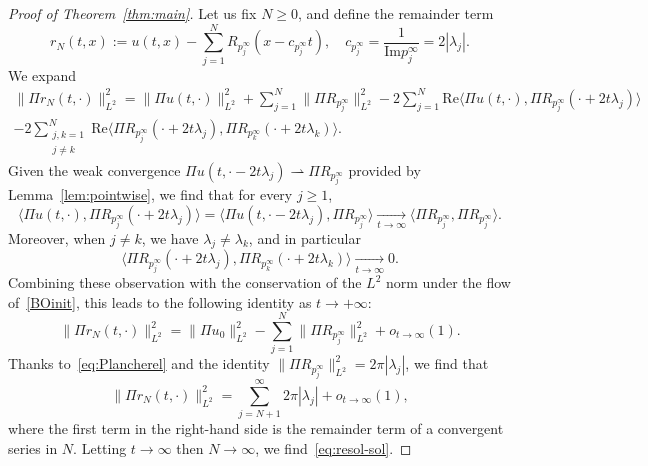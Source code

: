 \documentclass[english, 12pt]{amsart}%
\renewcommand{\Im}{\mathrm{Im}}
\renewcommand{\Re}{\mathrm{Re}}
\newcommand{\longrightarroww}[2] {\mathop{\longrightarrow}\limits_{#1}^{#2}}
\numberwithin{equation}{section}
\begin{document}
\begin{proof}[Proof of Theorem~\ref{thm:main}]
Let us fix $N\geq 0$, and define the remainder term
\[
 r_N(t,x):=u(t,x)-\sum_{j=1}^NR_{p_j^\infty}(x-c_{p_j^\infty}t),
 \quad
c_{p_j^\infty}=\frac{1}{\Im p_j^\infty}=2|\lambda_j|.
\]
We expand
\begin{multline*}
\|\Pi r_N(t,\cdot)\|_{L^2}^2
	=\|\Pi u(t,\cdot)\|_{L^2}^2+\sum_{j=1}^N \|\Pi R_{p_j^\infty}\|_{L^2}^2
	-2\sum_{j=1}^N\Re\langle \Pi u(t,\cdot),\Pi R_{p_j^\infty}(\cdot+2t\lambda_j)\rangle
	\\
	-2\sum_{\substack{j,k=1\\ j\neq k}}^N\Re\langle \Pi R_{p_j^\infty}(\cdot+2t\lambda_j),\Pi R_{p_k^\infty}(\cdot+2t\lambda_k)\rangle.
\end{multline*}
Given the weak convergence $\Pi u(t,\cdot-2t\lambda_j)\rightharpoonup \Pi R_{p_j^\infty}$ provided by Lemma~\ref{lem:pointwise}, we find that for every $j\geq 1$,
\[
\langle \Pi u(t,\cdot),\Pi R_{p_j^\infty}(\cdot+2t\lambda_j)\rangle
	=\langle \Pi u(t,\cdot-2t\lambda_j),\Pi R_{p_j^\infty}\rangle
	\longrightarroww{t\to\infty}{} \langle \Pi R_{p_j^\infty},\Pi R_{p_j^\infty}\rangle.
\]
Moreover, when $j\neq k$, we have $\lambda_j\neq \lambda_k$, and in particular
\[
\langle \Pi R_{p_j^\infty}(\cdot+2t\lambda_j),\Pi R_{p_k^\infty}(\cdot+2t\lambda_k)\rangle
	\longrightarroww{t\to\infty}{} 0.
\]
Combining these observation with the conservation of the $L^2$ norm under the flow of~\eqref{BOinit},  this leads to the following identity as $t\to+\infty$:
\begin{equation*}
\|\Pi r_N(t,\cdot)\|_{L^2}^2
	=\|\Pi u_0\|_{L^2}^2
	-\sum_{j=1}^N \|\Pi R_{p_j^\infty}\|_{L^2}^2
	+o_{t\to\infty}(1).
\end{equation*}
Thanks to~\eqref{eq:Plancherel} and the identity $\|\Pi R_{p_j^\infty}\|_{L^2}^2=2\pi|\lambda_j|$, we find that
\begin{equation*}
\|\Pi r_N(t,\cdot)\|_{L^2}^2
	=\sum_{j=N+1}^{\infty} 2\pi|\lambda_j|
	+o_{t\to\infty}(1),
\end{equation*}
where the first term in the right-hand side is the remainder term of a convergent series in $N$. Letting $t\to\infty$ then $N\to\infty$, we find~\eqref{eq:resol-sol}.


\end{proof}
\end{document}
